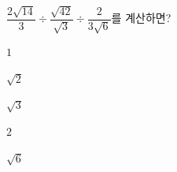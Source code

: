 $\dfrac{2\sqrt{14}}{3}\div\dfrac{\sqrt{42}}{\sqrt{3}}\div\dfrac{2}{3\sqrt{6}}$를 계산하면?
\begin{choices32}{\rule[-3ex]{0pt}{8ex}$1$}{\rule[-3ex]{0pt}{8ex}$\sqrt{2}$}{\rule[-3ex]{0pt}{8ex}$\sqrt{3}$}{\rule[-3ex]{0pt}{8ex}$2$}{\rule[-3ex]{0pt}{8ex}$\sqrt{6}$}\end{choices32}
